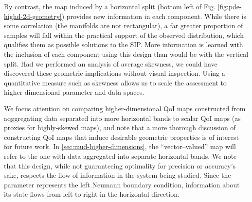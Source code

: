 By contrast, the map induced by a horizontal split (bottom left of Fig. \ref{fig:pde-highd-2d-geometry}) provides new information in each component.
While there is some correlation (the manifolds are not rectangular), a far greater proportion of samples will fall within the practical support of the observed distribution, which qualifies them as possible solutions to the SIP.
More information is learned with the inclusion of each component using this design than would be with the vertical split.
Had we performed an analysis of average skewness, we could have discovered these geometric implications without visual inspection.
Using a quantitative measure such as skewness allows us to scale the assessment to higher-dimensional parameter and data spaces.

We focus attention on comparing higher-dimensional QoI maps constructed from aqggregating data separated into more horizontal bands to scalar QoI maps (as proxies for highly-skewed maps), and note that a more thorough discussion of constructing QoI maps that induce desirable geometric properties is of interest for future work.
In \ref{sec:mud-higher-dimensions}, the ``vector--valued'' map will refer to the one with data aggregated into separate horizontal bands.
We note that this design, while not guaranteeing optimality for precision or accuracy's sake, respects the flow of information in the system being studied.
Since the parameter represents the left Neumann boundary condition, information about its state flows from left to right in the horizontal direction.

\FloatBarrier
